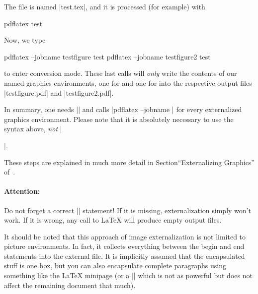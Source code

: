 {\begin{codeexample}
\end{codeexample}
%
\noindent The file is named |test.tex|, and it is processed (for example) with
%
\begin{codeexample}
pdflatex test
\end{codeexample}
%
\noindent Now, we type
%
\begin{codeexample}
pdflatex --jobname testfigure test
pdflatex --jobname testfigure2 test
\end{codeexample}
%
\noindent to enter conversion mode. These last calls will \emph{only} write the
contents of our named graphics environments, one for  and one
for  into the respective output files |testfigure.pdf| and
|testfigure2.pdf|.

In summary, one needs |\pgfrealjobname| and calls
|pdflatex --jobname | for every externalized graphics
environment. Please note that it is absolutely necessary to use the syntax
above, \emph{not} |\begin{pgfgraphicnamed}|.

These steps are explained in much more detail in Section``Externalizing
Graphics'' of~\cite{tikz}.


\paragraph{Attention:}

Do not forget a correct |\pgfrealjobname| statement! If it is missing,
externalization simply won't work. If it is wrong, any call to \LaTeX{} will
produce empty output files.

It should be noted that this approach of image externalization is not limited
to \Tikz{} picture environments. In fact, it collects everything between the
begin and end statements into the external file. It is implicitly assumed that
the encapsulated stuff is one box, but you can also encapsulate complete
paragraphs using something like the \LaTeX{} minipage (or a |\vbox| which is
not as powerful but does not affect the remaining document that much).

\end{pgfgraphicnamed}}
